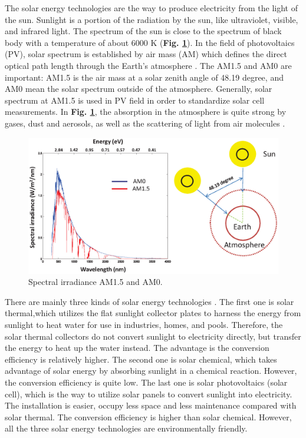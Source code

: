 \documentclass[a4paper, 12pt, titlepage,oneside,drop]{kthesis}
\begin{document}
The solar energy technologies are the way to produce electricity from the light of the sun. Sunlight is a portion of the radiation by the sun, like ultraviolet, visible,
and infrared light. The spectrum of the sun is close to the spectrum of black body with a temperature of about 6000 K (\textbf{Fig. \ref{spectrumsun}}). In the field of photovoltaics (PV), solar spectrum is established
by air mass (AM) which defines the direct optical path length through the Earth's atmosphere \cite{smestad2002optoelectronics}. The AM1.5 and AM0 are important: AM1.5 is the air mass at a solar zenith angle of 48.19 degree, and AM0 mean the solar spectrum 
outside of the atmosphere. Generally, solar spectrum at AM1.5 is used in PV field in order to standardize solar cell measurements. In \textbf{Fig. \ref{spectrumsun}}, the absorption in the atmosphere is quite strong by gases,
dust and aerosols, as well as the scattering of light from air molecules \cite{seinfeld2012atmospheric}.

\begin{figure}[H]
\centering
\includegraphics[scale=0.6]{spectrum.eps}
\caption{Spectral irradiance AM1.5 and AM0.}
\label{spectrumsun}
\end{figure}

There are mainly three kinds of solar energy technologies \cite{boyle2004renewable,XUE1991,Chiras201007}. The first one is solar thermal,which utilizes the flat sunlight collector plates to harness the energy from sunlight to heat water for use in industries, homes, and pools.
Therefore, the solar thermal collectors do not convert sunlight to electricity directly, but transfer the energy to heat up the water instead. The advantage is the conversion efficiency is relatively higher. The second one is 
solar chemical, which takes advantage of solar energy by absorbing sunlight in a chemical reaction. However, the conversion efficiency is quite low. The last one is solar photovoltaics (solar cell), which is the way
to utilize solar panels to convert sunlight into electricity. The installation is easier, occupy less space and less maintenance compared with solar thermal. The conversion efficiency is higher than solar chemical. However, 
all the three solar energy technologies are environmentally friendly.
\end{document}
